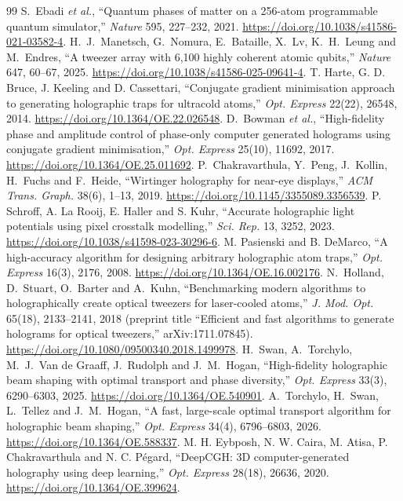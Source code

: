 \begin{thebibliography}{99}
 S.~Ebadi \emph{et al.}, ``Quantum phases of matter on a 256-atom programmable quantum simulator,'' \emph{Nature} 595, 227--232, 2021. \url{https://doi.org/10.1038/s41586-021-03582-4}.
 H.~J.~Manetsch, G.~Nomura, E.~Bataille, X.~Lv, K.~H.~Leung and M.~Endres, ``A tweezer array with 6,100 highly coherent atomic qubits,'' \emph{Nature} 647, 60--67, 2025. \url{https://doi.org/10.1038/s41586-025-09641-4}.
 T. Harte, G. D. Bruce, J. Keeling and D. Cassettari, ``Conjugate gradient minimisation approach to generating holographic traps for ultracold atoms,'' \emph{Opt. Express} 22(22), 26548, 2014. \url{https://doi.org/10.1364/OE.22.026548}.
 D.~Bowman \emph{et al.}, ``High-fidelity phase and amplitude control of phase-only computer generated holograms using conjugate gradient minimisation,'' \emph{Opt. Express} 25(10), 11692, 2017. \url{https://doi.org/10.1364/OE.25.011692}.
 P.~Chakravarthula, Y.~Peng, J.~Kollin, H.~Fuchs and F.~Heide, ``Wirtinger holography for near-eye displays,'' \emph{ACM Trans. Graph.} 38(6), 1--13, 2019. \url{https://doi.org/10.1145/3355089.3356539}.
 P. Schroff, A. La Rooij, E. Haller and S. Kuhr, ``Accurate holographic light potentials using pixel crosstalk modelling,'' \emph{Sci. Rep.} 13, 3252, 2023. \url{https://doi.org/10.1038/s41598-023-30296-6}.
 M. Pasienski and B. DeMarco, ``A high-accuracy algorithm for designing arbitrary holographic atom traps,'' \emph{Opt. Express} 16(3), 2176, 2008. \url{https://doi.org/10.1364/OE.16.002176}.
 N.~Holland, D.~Stuart, O.~Barter and A.~Kuhn, ``Benchmarking modern algorithms to holographically create optical tweezers for laser-cooled atoms,'' \emph{J. Mod. Opt.} 65(18), 2133--2141, 2018 (preprint title ``Efficient and fast algorithms to generate holograms for optical tweezers,'' arXiv:1711.07845). \url{https://doi.org/10.1080/09500340.2018.1499978}.
 H.~Swan, A.~Torchylo, M.~J.~Van de Graaff, J.~Rudolph and J.~M.~Hogan, ``High-fidelity holographic beam shaping with optimal transport and phase diversity,'' \emph{Opt. Express} 33(3), 6290--6303, 2025. \url{https://doi.org/10.1364/OE.540901}.
 A.~Torchylo, H.~Swan, L.~Tellez and J.~M.~Hogan, ``A fast, large-scale optimal transport algorithm for holographic beam shaping,'' \emph{Opt. Express} 34(4), 6796--6803, 2026. \url{https://doi.org/10.1364/OE.588337}.
 M. H. Eybposh, N. W. Caira, M. Atisa, P. Chakravarthula and N. C. P\'egard, ``DeepCGH: 3D computer-generated holography using deep learning,'' \emph{Opt. Express} 28(18), 26636, 2020. \url{https://doi.org/10.1364/OE.399624}.

\end{thebibliography}
